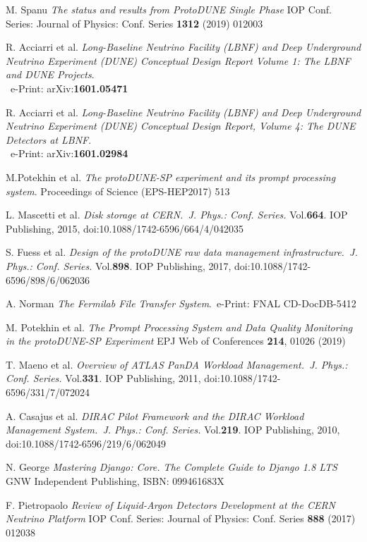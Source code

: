 \documentclass{webofc}
\begin{document}
\begin{thebibliography}{99}

M. Spanu
\emph{The status and results from ProtoDUNE Single Phase}
IOP Conf. Series: Journal of Physics: Conf. Series \textbf{1312} (2019) 012003

R. Acciarri et al.
\emph{Long-Baseline Neutrino Facility (LBNF) and Deep Underground Neutrino Experiment (DUNE) Conceptual Design Report Volume 1: The LBNF and DUNE Projects}.\\ ~e-Print: arXiv:\textbf{1601.05471}


R. Acciarri et al.
\emph{Long-Baseline Neutrino Facility (LBNF) and Deep Underground Neutrino Experiment (DUNE) Conceptual Design Report, Volume 4: The DUNE Detectors at LBNF}.\\~e-Print: arXiv:\textbf{1601.02984}

 M.Potekhin et al. \emph{The protoDUNE-SP experiment and its prompt
processing system}. Proceedings of Science (EPS-HEP2017) 513


L. Mascetti et al. \emph{Disk storage at CERN.~J. Phys.: Conf. Series.} Vol.\textbf{664}. IOP Publishing, 2015,
doi:10.1088/1742-6596/664/4/042035

S. Fuess et al. \emph{Design of the protoDUNE raw data management
infrastructure.~J. Phys.: Conf. Series.} Vol.\textbf{898}. IOP Publishing, 2017,
doi:10.1088/1742-6596/898/6/062036

A. Norman \emph{The Fermilab File Transfer System}.~e-Print: FNAL CD-DocDB-5412

 M. Potekhin et al. \emph{The Prompt Processing System
and Data Quality Monitoring in the protoDUNE-SP Experiment}
EPJ Web of Conferences \textbf{214}, 01026 (2019)

T. Maeno et al. \emph{Overview of ATLAS PanDA Workload Management.~J. Phys.: Conf. Series.} Vol.\textbf{331}. IOP Publishing, 2011,
doi:10.1088/1742-6596/331/7/072024


A. Casajus et al.  \emph{DIRAC Pilot Framework and the DIRAC
Workload Management System.~J. Phys.: Conf. Series.} Vol.\textbf{219}. IOP Publishing, 2010,
doi:10.1088/1742-6596/219/6/062049


N. George \emph{Mastering Django: Core. The Complete Guide to Django 1.8 LTS}~ GNW Independent Publishing, ISBN: 099461683X

 F. Pietropaolo \emph{Review of Liquid-Argon Detectors Development at the CERN
Neutrino Platform}
IOP Conf. Series:  Journal of Physics: Conf. Series \textbf{888} (2017) 012038


\end{thebibliography}
\end{document}
